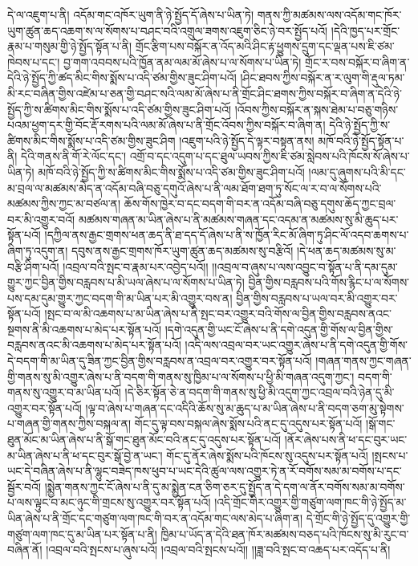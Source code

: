 དེ་ལ་འཇུག་པ་ནི། འདོམ་གང་འཁོར་ཡུག་ནི་ཉེ་སྤྱོད་དོ་ཞེས་པ་ཡིན་ཏེ། གནས་ཀྱི་མཚམས་ལས་འདོམ་གང་ཁོར་ཡུག་ཚུན་ཆད་འཆག་ས་ལ་སོགས་པ་བཤང་བའི་འགྲུལ་ཟགས་འཇུག་ཅིང་ཉེ་བར་སྤྱོད་པའོ། །དེའི་ཁྱད་པར་གྲོང་རྣམ་པ་གསུམ་གྱི་ཉེ་སྤྱོད་སྟོན་པ་ནི། གྲོང་རྩིག་པས་བསྐོར་ན་འོད་མའི་ཤིང་རྟ་ཕྱུགས་དྲུག་དང་ལྡན་པས་ཇི་ཙམ་ཁེབས་པ་དང་། བྱ་གག་འབབས་པའི་ཁྱོན་ནམ་ལམ་མོ་ཞེས་པ་ལ་སོགས་པ་ཡིན་ཏེ། གྲོང་ར་བས་བསྐོར་བ་ཞིག་ན་དེའི་ཉེ་སྤྱོད་ཀྱི་ཚད་མིང་གིས་སྨོས་པ་འདི་ཙམ་གྱིས་ཟུང་ཤིག་པའོ། །ཤིང་ཐབས་ཀྱིས་བསྐོར་ན་ར་ལུག་གི་རྡུལ་ཏམ་མི་རང་བཞིན་གྱིས་འཛེམ་པ་ཅན་གྱི་བཤང་སའི་ལམ་མོ་ཞེས་པ་ནི་གྲོང་ཤིང་ཐགས་ཀྱིས་བསྐོར་བ་ཞིག་ན་དེའི་ཉེ་སྤྱོད་ཀྱི་ས་ཚིགས་མིང་གིས་སྨོས་པ་འདི་ཙམ་གྱིས་ཟུང་ཤིག་པའོ། །འོབས་ཀྱིས་བསྐོར་ན་སྐས་ཐེམ་པ་བཅུ་གཉིས་པའམ་ཕྱག་དར་གྱི་བོང་རྡོ་རགས་པའི་ལམ་མོ་ཞེས་པ་ནི་གྲོང་འོབས་ཀྱིས་བསྐོར་བ་ཞིག་ན། དེའི་ཉེ་སྤྱོད་ཀྱི་ས་ཚིགས་མིང་གིས་སྨོས་པ་འདི་ཙམ་གྱིས་ཟུང་ཤིག །འཇུག་པའི་ཉེ་སྤྱོད་དེ་ལྟར་བསྟན་ནས། མཁོ་བའི་ཉེ་སྤྱོད་སྟོན་པ་ནི། དེའི་གནས་ནི་གོ་རེ་ལོང་དང་། འགྲོ་བ་དང་འདུག་པ་དང་ཐུལ་ཡབས་ཀྱིས་ཇི་ཙམ་སླེབས་པའི་ཁོངས་སོ་ཞེས་པ་ཡིན་ཏེ། མཁོ་བའི་ཉེ་སྤྱོད་ཀྱི་ས་ཚིགས་མིང་གིས་སྨོས་པ་འདི་ཙམ་གྱིས་ཟུང་ཤིག་པའོ། །ལམ་དུ་ཞུགས་པའི་མི་དང་མ་བྲལ་ལ་མཚམས་མེད་ན་འདོམ་བཞི་བཅུ་དགུའོ་ཞེས་པ་ནི་ལམ་ཐོག་ཐག་ཏུ་སོང་ལ་ར་བ་ལ་སོགས་པའི་མཚམས་ཀྱིས་ཀྱང་མ་བཙལ་ན། ཆོས་གོས་ཁྱེར་བ་དང་བདག་གི་བར་ན་འདོམ་བཞི་བཅུ་དགུས་ཆོད་ཀྱང་བྲལ་བར་མི་འགྱུར་བའོ། མཚམས་གཞན་མ་ཡིན་ཞེས་པ་ནི་མཚམས་གཞན་དང་འདམ་ན་མཚམས་སུ་མི་ཆུད་པར་སྟོན་པའོ། །དཀྱིལ་ནས་རྒྱང་གྲགས་ཕན་ཆད་ནི་ཐ་དད་དོ་ཞེས་པ་ནི་ས་ཁྱོན་རིང་མོ་ཞིག་ཏུ་ཤིང་ལོ་འདབ་ཆགས་པ་ཞིག་ཏུ་འདུག་ན། དབུས་ནས་རྒྱང་གྲགས་ཁོར་ཡུག་ཚུན་ཆད་མཚམས་སུ་བརྩིའོ། །དེ་ཕན་ཆད་མཚམས་སུ་མ་བརྩི་ཤིག་པའོ། །འབྲལ་བའི་སྤང་བ་རྣམ་པར་འབྱེད་པའོ།། །།འབྲལ་བ་ཞུས་པ་ལས་འབྱུང་བ་སྟོན་པ་ནི་དམ་དུམ་གྱུར་ཀྱང་བྱིན་གྱིས་བརླབས་པ་མི་ཡལ་ཞེས་པ་ལ་སོགས་པ་ཡིན་ཏེ། བྱིན་གྱིས་བརླབས་པའི་གོས་རྙིང་པ་ལ་སོགས་པས་དམ་དུམ་གྱུར་ཀྱང་བདག་གི་མ་ཡིན་པར་མི་འགྱུར་བས་ན། བྱིན་གྱིས་བརླབས་པ་ཡལ་བར་མི་འགྱུར་བར་སྟོན་པའོ། །སྤང་བ་ལ་མི་འཆགས་པ་མ་ཡིན་ཞེས་པ་ནི་སྤང་བར་འགྱུར་བའི་གོས་ལ་བྱིན་གྱིས་བརླབས་ནའང་སྔགས་ནི་མི་འཆགས་པ་མེད་པར་སྟོན་པའོ། །དགེ་འདུན་གྱི་ཡང་ངོ་ཞེས་པ་ནི་དགེ་འདུན་གྱི་གོས་ལ་བྱིན་གྱིས་བརླབས་ནའང་མི་འཆགས་པ་མེད་པར་སྟོན་པའོ། །འདི་ལས་འབྲལ་བར་ཡང་འགྱུར་ཞེས་པ་ནི་དགེ་འདུན་གྱི་གོས་དེ་བདག་གི་མ་ཡིན་དུ་ཟིན་ཀྱང་བྱིན་གྱིས་བརླབས་ན་འབྲལ་བར་འགྱུར་བར་སྟོན་པའོ། །གཞན་གནས་ཀྱང་གཞན་གྱི་གནས་སུ་མི་འགྱུར་ཞེས་པ་ནི་བདག་གི་གནས་སུ་ཁྱིམ་པ་ལ་སོགས་པ་ཕྱི་མི་གཞན་འདུག་ཀྱང་། བདག་གི་གནས་སུ་འགྱུར་བ་མ་ཡིན་པའོ། །དེ་ཅིར་སྟོན་ཅེ་ན་བདག་གི་གནས་སུ་ཕྱི་མི་འདུག་ཀྱང་འབྲལ་བའི་ཉེན་དུ་མི་འགྱུར་བར་སྟོན་པའོ། །ལྟ་བ་ཞེས་པ་གཞན་དང་འདིའི་ཆོས་སུ་མ་ཆུད་པ་མ་ཡིན་ཞེས་པ་ནི་བདག་ཅག་མུ་སྟེགས་པ་གཞན་གྱི་གནས་ཀྱིས་བསྐལ་ན། གོང་དུ་ལྟ་བས་བསྐལ་ཞེས་སྨོས་པའི་ནང་དུ་འདུས་པར་སྟོན་པའོ། །སྒོ་གང་ཐུན་མོང་མ་ཡིན་ཞེས་པ་ནི་སྒོ་གང་ཐུན་མོང་བའི་ནང་དུ་འདུས་པར་སྟོན་པའོ། །ནོར་ཞེས་པས་ནི་ཕ་དང་བུར་ཡང་མ་ཡིན་ཞེས་པ་ནི་ཕ་དང་བུར་སྒོ་བྱེ་ན་ཡང་། གོང་དུ་ནོར་ཞེས་སྨོས་པའི་ཁོངས་སུ་འདུས་པར་སྟོན་པའོ། །སྤངས་པ་ཡང་དེ་བཞིན་ཞེས་པ་ནི་ལྷུང་བཟེད་ཁས་ཕུབ་པ་ཡང་དེའི་ཚུལ་ལས་འགྱུར་ཏེ་ན་རོ་བགོས་སམ་མ་བགོས་པ་དང་སྦྱོར་བའོ། །སྨྱེན་གནས་ཀྱང་ངོ་ཞེས་པ་ནི་དུ་མ་སྨྱེན་ངན་ཅིག་ཅར་དུ་སྤྱོད་ན་དེ་དག་ལ་ནོར་བགོས་སམ་མ་བགོས་པ་ལས་ལྟུང་བ་མང་ཉུང་གི་གྲངས་སུ་འགྱུར་བར་སྟོན་པའོ། །འདི་གྲོང་གིར་འགྱུར་གྱི་གཙུག་ལག་ཁང་གི་ཉེ་སྤྱོད་མ་ཡིན་ཞེས་པ་ནི་གྲོང་དང་གཙུག་ལག་ཁང་གི་བར་ན་འདོམ་གང་ལས་མེད་པ་ཞིག་ན། དེ་གྲོང་གི་ཉེ་སྤྱོད་དུ་འགྱུར་གྱི་གཙུག་ལག་ཁང་དུ་མ་ཡིན་པར་སྟོན་པ་ནི། ཁྱིམ་པ་ཡོད་ན་དེའི་ཐན་ཁོར་མཚམས་བཅད་པའི་ཁོངས་སུ་མི་རུང་བ་བཞིན་ནོ། །འབྲལ་བའི་སྤངས་པ་ཞུས་པའོ། །འབྲལ་བའི་སྤངས་པའོ།། །།ཟླ་བའི་སྤང་བ་འཆད་པར་འདོད་པ་ནི། 